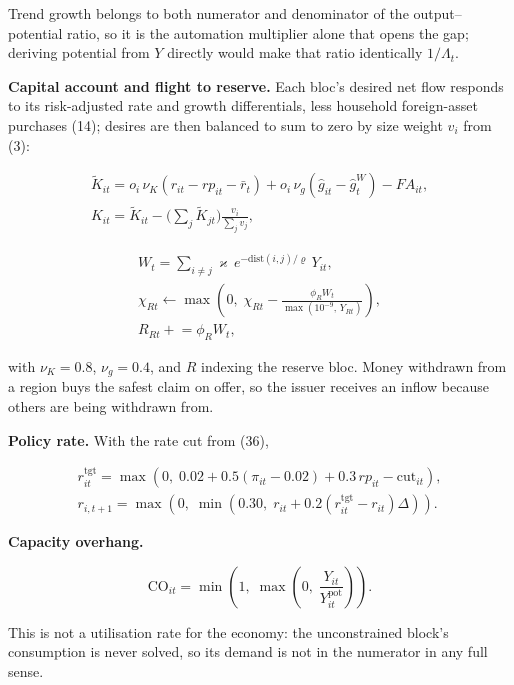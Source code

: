 \documentclass[preprint,review,12pt]{elsarticle}
\begin{document}
Trend growth belongs to both numerator and denominator of the
output--potential ratio, so it is the automation multiplier alone that
opens the gap; deriving potential from \(Y\) directly would make that
ratio identically \(1/\Lambda_t\).

\textbf{Capital account and flight to reserve.} Each bloc's desired net
flow responds to its risk-adjusted rate and growth differentials, less
household foreign-asset purchases (14); desires are then balanced to sum
to zero by size weight \(v_i\) from (3):

\[\begin{gathered} \tilde{K}_{it} = o_i \, \nu_K \left( r_{it} - rp_{it} - \bar{r}_t \right) + o_i \, \nu_g \left( \hat{g}_{it} - \hat{g}^W_t \right) - FA_{it}, \\ K_{it} = \tilde{K}_{it} - \Big( \sum_j \tilde{K}_{jt} \Big) \frac{v_i}{\sum_j v_j}, \end{gathered}\]

\[\begin{gathered} W_t = \sum_{i \neq j} \varkappa \, e^{-\mathrm{dist}(i,j)/\varrho} \, Y_{it}, \\ \chi_{Rt} \leftarrow \max\left( 0,\; \chi_{Rt} - \frac{\phi_R W_t}{\max(10^{-9},\, Y_{Rt})} \right), \\ R_{Rt} \mathrel{+}= \phi_R W_t, \end{gathered} \tag{B.9}\]

with \(\nu_K = 0.8\), \(\nu_g = 0.4\), and \(R\) indexing the reserve
bloc. Money withdrawn from a region buys the safest claim on offer, so
the issuer receives an inflow because others are being withdrawn from.

\textbf{Policy rate.} With the rate cut from (36),

\[\begin{gathered} r^{\mathrm{tgt}}_{it} = \max\left( 0,\; 0.02 + 0.5 (\pi_{it} - 0.02) + 0.3 \, rp_{it} - \mathrm{cut}_{it} \right), \\ r_{i,t+1} = \max\left( 0,\; \min\left( 0.30,\; r_{it} + 0.2 \left( r^{\mathrm{tgt}}_{it} - r_{it} \right) \Delta \right) \right). \end{gathered} \tag{B.10}\]

\textbf{Capacity overhang.}

\[\mathrm{CO}_{it} = \min\left( 1,\; \max\left( 0,\; \frac{Y_{it}}{Y^{\mathrm{pot}}_{it}} \right) \right). \tag{B.11}\]

This is not a utilisation rate for the economy: the unconstrained
block's consumption is never solved, so its demand is not in the
numerator in any full sense.
\end{document}

